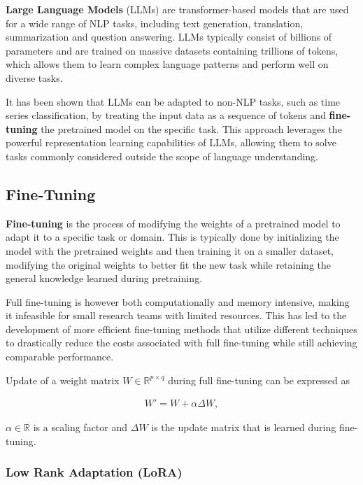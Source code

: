 \textbf{Large Language Models} (LLMs) are transformer-based models that are used for a wide range of NLP tasks, including text generation, translation, summarization and question answering.
LLMs typically consist of billions of parameters and are trained on massive datasets containing trillions of tokens, which allows them to learn complex language patterns and perform well on diverse tasks.

It has been shown that LLMs can be adapted to non-NLP tasks, such as time series classification, by treating the input data as a sequence of tokens and \textbf{fine-tuning} the pretrained model on the specific task.
This approach leverages the powerful representation learning capabilities of LLMs, allowing them to solve tasks commonly considered outside the scope of language understanding.

\subsection{Fine-Tuning}

\textbf{Fine-tuning} is the process of modifying the weights of a pretrained model to adapt it to a specific task or domain.
This is typically done by initializing the model with the pretrained weights and then training it on a smaller dataset, modifying the original weights to better fit the new task while retaining the general knowledge learned during pretraining. \parencite{Howard2018}

Full fine-tuning is however both computationally and memory intensive, making it infeasible for small research teams with limited resources.
This has led to the development of more efficient fine-tuning methods that utilize different techniques to drastically reduce the costs associated with full fine-tuning while still achieving comparable performance. \parencite{Han2024}

Update of a weight matrix $W \in \mathbb{R}^{p \times q}$ during full fine-tuning can be expressed as

\begin{align}
    W' = W + \alpha \Delta W,
\end{align}

$\alpha \in \mathbb{R}$ is a scaling factor and $\Delta W$ is the update matrix that is learned during fine-tuning.

\subsubsection{Low Rank Adaptation (LoRA)}\label{subsubsec:03-lora}

